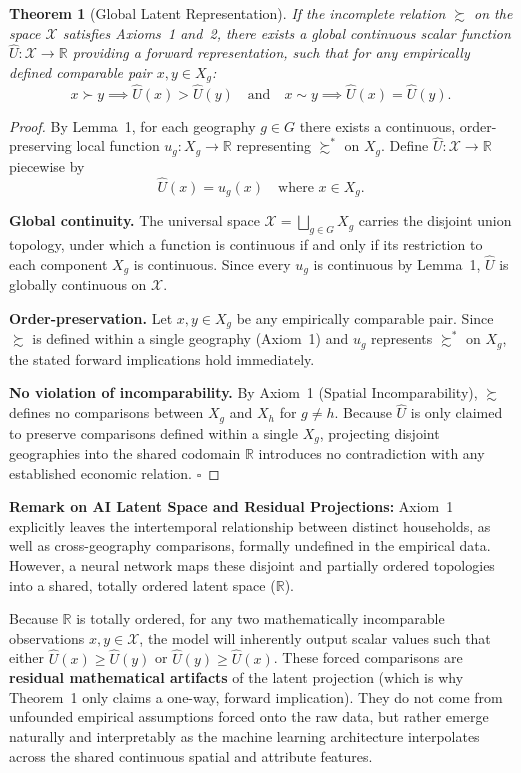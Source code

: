 \documentclass{article}
\newtheorem{theorem}{Theorem}
\begin{document}
\begin{theorem}[Global Latent Representation]
If the incomplete relation $\succsim$ on the space $\mathcal{X}$ satisfies Axioms~1
and~2, there exists a global continuous scalar function
$\hat{U} : \mathcal{X} \to \mathbb{R}$ providing a forward representation, such that
for any empirically defined comparable pair $x, y \in X_g$:
$$ x \succ y \implies \hat{U}(x) > \hat{U}(y)
   \quad\text{and}\quad
   x \sim y \implies \hat{U}(x) = \hat{U}(y). $$
\end{theorem}

\begin{proof}
By Lemma~1, for each geography $g \in G$ there exists a continuous, order-preserving
local function $u_g : X_g \to \mathbb{R}$ representing $\succsim^*$ on $X_g$. Define
$\hat{U} : \mathcal{X} \to \mathbb{R}$ piecewise by
$$ \hat{U}(x) = u_g(x) \quad \text{where } x \in X_g. $$

\noindent\textbf{Global continuity.}
The universal space $\mathcal{X} = \bigsqcup_{g \in G} X_g$ carries the disjoint union
topology, under which a function is continuous if and only if its restriction to each
component $X_g$ is continuous. Since every $u_g$ is continuous by Lemma~1, $\hat{U}$
is globally continuous on $\mathcal{X}$.

\noindent\textbf{Order-preservation.}
Let $x, y \in X_g$ be any empirically comparable pair. Since $\succsim$ is defined
within a single geography (Axiom~1) and $u_g$ represents $\succsim^*$ on $X_g$, the
stated forward implications hold immediately.

\noindent\textbf{No violation of incomparability.}
By Axiom~1 (Spatial Incomparability), $\succsim$ defines no comparisons between $X_g$
and $X_h$ for $g \neq h$. Because $\hat{U}$ is only claimed to preserve comparisons
defined within a single $X_g$, projecting disjoint geographies into the shared codomain
$\mathbb{R}$ introduces no contradiction with any established economic relation.
\hfill$\square$
\end{proof}

\textbf{Remark on AI Latent Space and Residual Projections:}
Axiom~1 explicitly leaves the intertemporal relationship between distinct households,
as well as cross-geography comparisons, formally undefined in the empirical data.
However, a neural network maps these disjoint and partially ordered topologies into a
shared, totally ordered latent space ($\mathbb{R}$).

Because $\mathbb{R}$ is totally ordered, for any two mathematically incomparable
observations $x, y \in \mathcal{X}$, the model will inherently output scalar values such
that either $\hat{U}(x) \ge \hat{U}(y)$ or $\hat{U}(y) \ge \hat{U}(x)$. These forced
comparisons are \textbf{residual mathematical artifacts} of the latent projection (which
is why Theorem~1 only claims a one-way, forward implication). They do not come from
unfounded empirical assumptions forced onto the raw data, but rather emerge naturally
and interpretably as the machine learning architecture interpolates across the shared
continuous spatial and attribute features.
\end{document}
